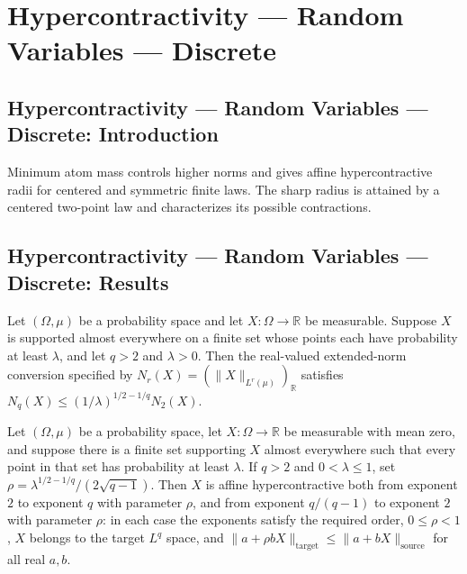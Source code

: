 \section{Hypercontractivity --- Random Variables --- Discrete}
\subsection*{Hypercontractivity --- Random Variables --- Discrete: Introduction}
Minimum atom mass controls higher norms and gives affine hypercontractive radii for centered and symmetric finite laws. The sharp radius is attained by a centered two-point law and characterizes its possible contractions.

\subsection*{Hypercontractivity --- Random Variables --- Discrete: Results}

\begin{theorem}
\leanok
{}
Let $(\Omega,\mu)$ be a probability space and let $X:\Omega\to\mathbb R$ be measurable.
Suppose $X$ is supported almost everywhere on a finite set whose points each have
probability at least $\lambda$, and let $q>2$ and $\lambda>0$. Then the real-valued
extended-norm conversion specified by $N_r(X)=(\|X\|_{L^r(\mu)})_{\mathbb R}$ satisfies
$N_q(X)\le (1/\lambda)^{1/2-1/q}N_2(X)$.
\end{theorem}

\begin{theorem}
\leanok
{}
Let $(\Omega,\mu)$ be a probability space, let $X:\Omega\to\mathbb R$ be measurable with
mean zero, and suppose there is a finite set supporting $X$ almost everywhere such that
every point in that set has probability at least $\lambda$. If $q>2$ and
$0<\lambda\le1$, set $\rho=\lambda^{1/2-1/q}/(2\sqrt{q-1})$. Then $X$ is affine
hypercontractive both from exponent $2$ to exponent $q$ with parameter $\rho$, and from
exponent $q/(q-1)$ to exponent $2$ with parameter $\rho$: in each case the exponents
satisfy the required order, $0\le\rho<1$, $X$ belongs to the target $L^q$ space, and
$\|a+\rho bX\|_{\text{target}}\le\|a+bX\|_{\text{source}}$ for all real $a,b$.
\end{theorem}

